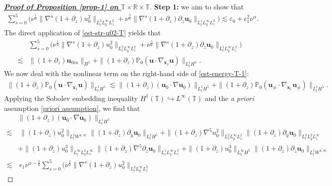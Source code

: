 \documentclass[11pt,reqno]{article}
\numberwithin{equation}{section}
\newcommand\R{{\mathbb R}}
\newcommand\T{{\mathbb T}}
\newcommand\PP{{\mathbb P}}
\newcommand\x{\bm{x}}
\newcommand\uu{\bm{u}}
\let\pa=\partial
\let\na=\nabla
\let\al=\alpha
\let\var=\varepsilon
\let\f=\frac
\let\ep=\epsilon
\begin{document}
\begin{proof}[\underline{\textbf{Proof of Proposition \ref{prop-1} on $\T\times\R\times \T$}}]
    \noindent\textbf{Step 1:} we aim to show that
    \begin{align}\label{est-energy-1-T}
        \sum_{s=0}^5\big(\nu^{\f13}\|\nabla^s(1+\pa_z)u_0^2\|_{L^2_tL^\infty_yL^2_z}
	    +\nu^{\f56}\|\nabla^s(1+\pa_z)\pa_z\uu_0\|_{L^1_t L^\infty_yL^2_z}\big)
        \lesssim \var_0+ \ep_1^2 \nu^{\al}.
    \end{align}
    The direct application of \eqref{est-str-u02-T} yields that
    \begin{align}\label{est-energy-T-1}
	&\sum_{s=0}^5\big(\nu^{\f13}\|\nabla^s(1+\pa_z)u_0^2\|_{L^2_tL^\infty_yL^2_z}
	+\nu^{\f56}\|\nabla^s(1+\pa_z)\pa_z\uu_0\|_{L^1_t L^\infty_yL^2_z}\big)
    \nonumber
    \\
	\lesssim &\|(1+\pa_z)\uu_{0in}\|_{H^5}
    +\|(1+\pa_z)\PP_0(\uu\cdot\nabla_{\x_1}\uu)\|_{L^1_t{H^5}}.
\end{align}
   We now deal with the nonlinear term on the right-hand side of \eqref{est-energy-T-1}:
   \begin{align}\label{est-F-T}
       \|(1+\pa_z)\PP_0(\uu\cdot\nabla_{\x_1}  \uu)\|_{L^1_t{H^5}}
       \lesssim 
       \|(1+\pa_z)(\uu_0\cdot\nabla \uu_0)\|_{L^1_t{H^5}}
       +\|(1+\pa_z)\PP_0(\uu_{\not=}\cdot\nabla_{\x_1} \uu_{\not=})\|_{L^1_t{H^5}}.
    \end{align}
    Applying the Sobolev embedding inequality
    $H^1(\T)\hookrightarrow L^{\infty}(\T)$
    and the \textit{a priori} assumption \eqref{priori assumption}, we find that
   \begin{align}\label{est-F1-T}  
       &\|(1+\pa_z)(\uu_0\cdot\nabla \uu_0)\|_{L^1_t{H^5}}
       \nonumber
       \\
       \lesssim & ~
       \|(1+\pa_z)u_0^2\|_{L^2_tW^{4,\infty}} \|(1+\pa_z)\pa_y\uu_0\|_{L^2_tH^5}
       +\|(1+\pa_z)\nabla^5 u_0^2\|_{L^2_tL^\infty_{y}L^2_z} \|(1+\pa_z)\pa_y\uu_0\|_{L^2_tL^2_yL^\infty_{z}}
       \nonumber
       \\
       &+\|(1+\pa_z)u_0^3\|_{L^\infty_tL^2_yL^\infty_{z}} \|(1+\pa_z)\na^5\pa_z\uu_0\|_{L^1_tL^\infty_yL^2_{z}}
       +\|(1+\pa_z) u_0^3\|_{L^\infty_tH^5} \|(1+\pa_z)\pa_z\uu_0\|_{L^1_tW^{4,\infty}}
       \nonumber
       \\  
       \lesssim&~ \ep_1 \nu^{\al-\f56}\sum_{s=0}^5\big(\nu^{\f13}\|\nabla^s(1+\pa_z)u_0^2\|_{L^2_tL^\infty_yL^2_z}

\end{align}
\end{proof}
\end{document}
